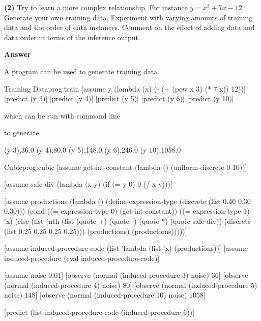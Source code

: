 \documentclass[11pt,reqno]{amsart}
\newif\ifanswers
\newcommand{\+}[1]{\ensuremath{{\mathbf{#1}}}}
\begin{document}
\fi

\vspace{1cm}
{\bf (2)} Try to learn a more complex relationship.  For instance $y=x^3 + 7x -12$.  Generate your own training data.  Experiment with varying amounts of training data and the order of data instances.  Comment on the effect of adding data and data order in terms of the inference output.

\ifanswers
\begin{quotation}
\end{quotation}

 {\bf Answer } 
 
 A program can be used to generate training data 
 
 \begin{code}{Training Data}{prog:train}
[assume y (lambda (x) (- (+ (pow x 3) (* 7 x)) 12))]
[predict (y 3)]
[predict (y 4)]
[predict (y 5)]
[predict (y 6)]
[predict (y 10)]
 \end{code}
 
 which can be run with command line 
 
 to generate
  \begin{code}{}{}
(y 3),36.0
(y 4),80.0
(y 5),148.0
(y 6),246.0
(y 10),1058.0
 \end{code}

 
 


 \begin{code}{Cubic}{prog:cubic}
 [assume get-int-constant
  (lambda () (uniform-discrete 0 10))]

[assume safe-div 
  (lambda (x y) (if (= y 0) 0 (/ x y)))]

[assume productions 
  (lambda ()
    (define expression-type (discrete (list 0.40 0.30 0.30)))
      (cond
        ((= expression-type 0) (get-int-constant))
        ((= expression-type 1) 'x)
        (else
          (list
            (nth (list (quote +) (quote -) (quote *) (quote safe-div))
                 (discrete (list 0.25 0.25 0.25 0.25)))
              (productions) (productions)))))]

[assume induced-procedure-code (list 'lambda (list 'x) (productions))]
[assume induced-procedure (eval induced-procedure-code)]

[assume noise 0.01]
[observe (normal (induced-procedure 3) noise) 36]
[observe (normal (induced-procedure 4) noise) 80]
[observe (normal (induced-procedure 5) noise) 148]
[observe (normal (induced-procedure 10) noise) 1058]

[predict (list induced-procedure-code (induced-procedure 6))]
 \end{code} 
\end{document}
